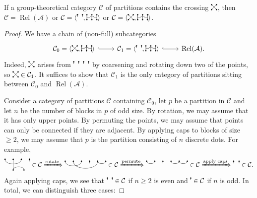 \documentclass[11pt]{amsart}
\newcommand{\pd}[2][black]{\filldraw[#1] (#2) circle (1.5pt)} %
\newcommand\crossing{\tikz[baseline=(origin.base),scale=0.5]{
    \coordinate (origin) at (0,0); %
    \pd{0,0}; \pd{.5,0}; \pd{0,.5}; \pd{.5,.5};
    \draw (0,0) -- (.5,.5);
    \draw (.5,0) -- (0,.5);
}}
\newcommand\coarsener{\tikz[baseline=(origin.base),scale=0.5]{
    \coordinate (origin) at (0,0);
    \pd{0,0}; \pd{.5,0}; \pd{1,0}; \pd{0,.5}; \pd{.5,.5}; \pd{1,.5};
    \draw (0,0) -- (0,.5); \draw (.5,0) -- (.5,.5); \draw (1,0) -- (1,.5);
    \draw (0,.25) -- (.3,.25) to[out=up,in=up] (.7,.25) -- (1,.25);
}}
\newcommand\upperdots[1]{\tikz[baseline=(origin.base),scale=0.5]{
    \coordinate (origin) at (0,0);
    \foreach \i in {0,...,\numexpr#1-1\relax} {
        \pd{0.5*\i,.5};
        \draw (0.5*\i,.3) -- (0.5*\i,.5);
    }
}}
\theoremstyle{definition}
\theoremstyle{remark}
\newcommand\cA{\mathcal A}
\newcommand\cC{\mathcal C}
\renewcommand\:\colon
\renewcommand\:\colon
\newcommand\Rel{\operatorname{Rel}}
\begin{document}
\begin{lemma} \label{l:crossing-partitions}
    If a group-theoretical category $\cC$ of partitions contains the crossing $\crossing$, then $\cC = \Rel(\cA)$ or $\cC = \langle{}\upperdots{2}, \coarsener\rangle{}$ or $\cC = \langle{}\crossing, \coarsener\rangle{}$.
\end{lemma}
\begin{proof}
    We have a chain of (non-full) subcategories
    \[\begin{tikzcd}
        \cC_0 = \langle{}\crossing, \coarsener\rangle{} \arrow[hook]{r} &
        \cC_1 = \langle{}\upperdots{2}, \coarsener\rangle{} \arrow[hook]{r} &
        \Rel(\cA).
    \end{tikzcd}\]
    Indeed, $\crossing$ arises from $\upperdots{4}$ by coarsening and rotating down two of the points, so $\crossing \in \cC_1$. It suffices to show that $\cC_1$ is the only category of partitions sitting between $\cC_0$ and $\Rel(\cA)$.

    Consider a category of partitions $\cC$ containing $\cC_0$, let $p$ be a partition in $\cC$ and let $n$ be the number of blocks in $p$ of odd size. By rotation, we may assume that it has only upper points. By permuting the points, we may assume that points can only be connected if they are adjacent. By applying caps to blocks of size $\geq 2$, we may assume that $p$ is the partition consisting of $n$ discrete dots. For example,
    \[
        \begin{tikzpicture}[baseline=5pt,scale=0.58]
            \pd{.25,1}; \pd{1,1}; \pd{1.75,1}; \pd{2.5,1};
            \pd{1,0}; \pd{2,0};
            \draw (.25,1) to[out=down,in=down] (1.75,1);
            \draw (1,1) -- (1,0) to[out=up,in=up] (2,0);
            \draw (2.5,.8) -- (2.5,1);
        \end{tikzpicture} \in \cC \xRightarrow{\text{rotate}}
        \begin{tikzpicture}[baseline=8pt,scale=0.58]
            \pd{.25,1}; \pd{1,1}; \pd{1.75,1}; \pd{2.5,1}; \pd{3.25,1}; \pd{4,1};
            \draw (.25,1) to[out=down,in=down] (1.75,1);
            \draw (1,1) to[out=down,in=down] (3.25,1) to[out=down,in=down] (4,1);
            \draw (2.5,.8) -- (2.5,1);
        \end{tikzpicture} \in \cC \xRightarrow{\text{permute}}
        \begin{tikzpicture}[baseline=8pt,scale=0.58]
            \pd{.25,1}; \pd{1,1}; \pd{1.75,1}; \pd{2.5,1}; \pd{3.25,1}; \pd{4,1};
            \draw (.25,1) to[out=down,in=down] (1,1);
            \draw (2.5,1) to[out=down,in=down] (3.25,1) to[out=down,in=down] (4,1);
            \draw (1.75,.8) -- (1.75,1);
        \end{tikzpicture} \in \cC \xRightarrow{\text{apply caps}}
        \begin{tikzpicture}[baseline=8pt,scale=0.58]
            \pd{.25,1}; \pd{.75,1};
            \draw (.25,.8) -- (.25,1);
            \draw (.75,.8) -- (.75,1);
        \end{tikzpicture} \in \cC.
    \]
    Again applying caps, we see that $\upperdots{2} \in \cC$ if $n \geq 2$ is even and $\upperdots{1} \in \cC$ if $n$ is odd. In total, we can distinguish three cases:


\end{proof}
\end{document}
